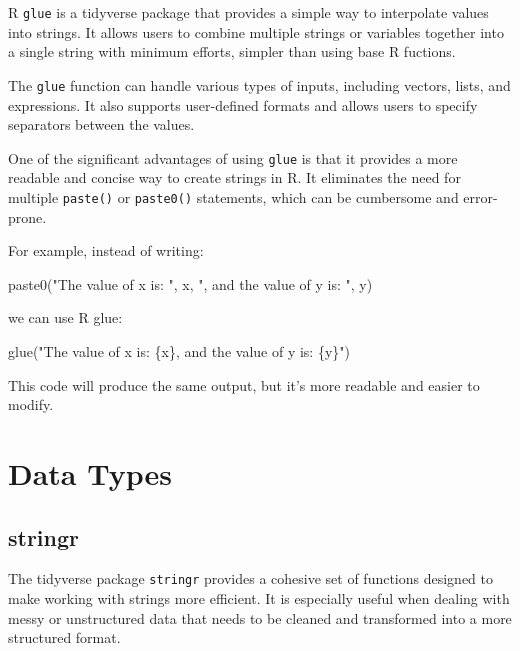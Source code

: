 \documentclass[
]{book}
\newenvironment{Shaded}{\begin{snugshade}}{\end{snugshade}}
\newcommand{\FunctionTok}[1]{\textcolor[rgb]{0.00,0.00,0.00}{#1}}
\newcommand{\NormalTok}[1]{#1}
\newcommand{\StringTok}[1]{\textcolor[rgb]{0.31,0.60,0.02}{#1}}
\begin{document}
R \texttt{glue} is a tidyverse package that provides a simple way to interpolate values into strings. It allows users to combine multiple strings or variables together into a single string with minimum efforts, simpler than using base R fuctions.

The \texttt{glue} function can handle various types of inputs, including vectors, lists, and expressions. It also supports user-defined formats and allows users to specify separators between the values.

One of the significant advantages of using \texttt{glue} is that it provides a more readable and concise way to create strings in R. It eliminates the need for multiple \texttt{paste()} or \texttt{paste0()} statements, which can be cumbersome and error-prone.

For example, instead of writing:

\begin{Shaded}
\begin{Highlighting}[]
\FunctionTok{paste0}\NormalTok{(}\StringTok{"The value of x is: "}\NormalTok{, x, }\StringTok{", and the value of y is: "}\NormalTok{, y)}
\end{Highlighting}
\end{Shaded}

we can use R glue:

\begin{Shaded}
\begin{Highlighting}[]
\FunctionTok{glue}\NormalTok{(}\StringTok{"The value of x is: \{x\}, and the value of y is: \{y\}"}\NormalTok{)}
\end{Highlighting}
\end{Shaded}

This code will produce the same output, but it's more readable and easier to modify.

\hypertarget{data-types}{%
\section{Data Types}\label{data-types}}

\hypertarget{stringr}{%
\subsection{stringr}\label{stringr}}

The tidyverse package \texttt{stringr} provides a cohesive set of functions designed to make working with strings more efficient. It is especially useful when dealing with messy or unstructured data that needs to be cleaned and transformed into a more structured format.
\end{document}
